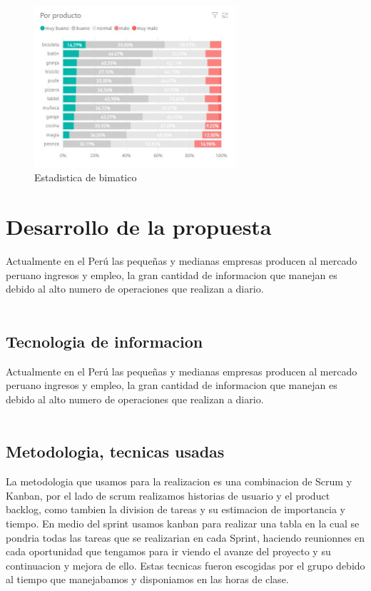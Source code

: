 \documentclass[twoside,twocolumn]{article}
\begin{document}
\begin{figure}[htb]
	\begin{center}
		\includegraphics[width=7.5cm]{./IMAGENES/esta3} 
		\caption{Estadistica de bimatico}
	\end{center}
\end{figure}

\section{Desarrollo de la propuesta}
Actualmente en el Perú las pequeñas y medianas empresas producen al mercado peruano ingresos y empleo, la gran cantidad de informacion que manejan es debido al alto numero de operaciones que realizan a diario.\\ \\

\subsection{Tecnologia de informacion}
Actualmente en el Perú las pequeñas y medianas empresas producen al mercado peruano ingresos y empleo, la gran cantidad de informacion que manejan es debido al alto numero de operaciones que realizan a diario.\\ \\

\subsection{Metodologia, tecnicas usadas}
La metodologia que usamos para la realizacion es una combinacion de Scrum y Kanban, por el lado de scrum realizamos historias de usuario y el product backlog, como tambien la division de tareas y su estimacion de importancia y tiempo. En medio del sprint usamos kanban para realizar una tabla en la cual se pondria todas las tareas que se realizarian en cada Sprint, haciendo reunionnes en cada oportunidad que tengamos para ir viendo el avanze del proyecto y su continuacion y mejora de ello. Estas tecnicas fueron escogidas por el grupo debido al tiempo que manejabamos y disponiamos en las horas de clase.
\end{document}
